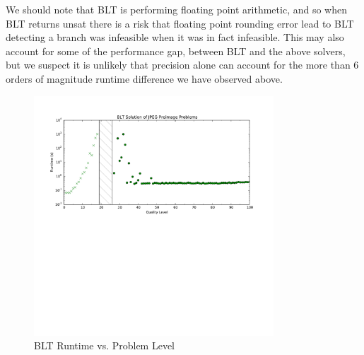 We should note that BLT is performing floating point arithmetic, and so when BLT
returns unsat there is a risk that floating point rounding error lead to BLT
detecting a branch was infeasible when it was in fact infeasible.  This may also
account for some of the performance gap, between BLT and the above solvers, but
we suspect it is unlikely that precision alone can account for the more than 6
orders of magnitude runtime difference we have observed above.

\begin{figure}[htb]
  \centering
    \includegraphics[width=0.8\textwidth]{figures/blt_benchmark.pdf}
    \caption{BLT Runtime vs. Problem Level}
    \label{fig:blt-perf}
\end{figure}

\FloatBarrier


